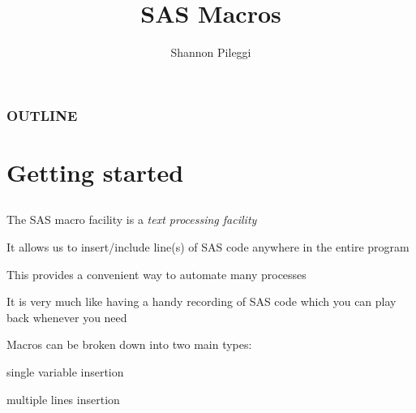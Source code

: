 




\title[Lecture 5]{SAS Macros}
\author[Pileggi]{Shannon Pileggi}


\date{}




\begin{frame}
\titlepage
\end{frame}

\begin{frame}
\frametitle{OUTLINE\qquad\qquad\qquad} \tableofcontents[hideallsubsections]
\end{frame}



\section[Getting started]{Getting started}
\subsection{}



\begin{frame}
\bi
\item The SAS macro facility is a \emph{text processing facility}
\item It allows us to insert/include line(s) of SAS code anywhere in the entire program
\item This provides a  convenient way to automate many processes
\item It is very much like having a handy recording of SAS code which you can play back whenever you need
\item Macros can be broken down into two main types: \\
\bi
\item single variable insertion \\
\item multiple lines insertion
\ei
\ei
\end{frame}


